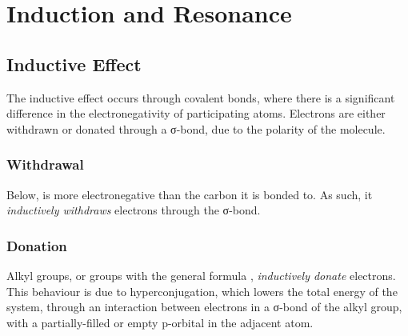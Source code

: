 


\pagebreak
\section{Induction and Resonance}

\subsection{Inductive Effect}

	The inductive effect occurs through covalent bonds, where there is a significant difference in the electronegativity of
	participating atoms. Electrons are either withdrawn or donated through a σ-bond, due to the polarity of the molecule.

	\subsubsection{Withdrawal}

		Below, \ch{\chlorine} is more electronegative than the carbon it is bonded to. As such, it
		\textit{inductively withdraws} electrons through the σ-bond.




	\subsubsection{Donation}

		Alkyl groups, or groups with the general formula , \textit{inductively donate} electrons. This behaviour
		is due to hyperconjugation, which lowers the total energy of the system, through an interaction between electrons in a
		σ-bond of the alkyl group, with a partially-filled or empty p-orbital in the adjacent atom.






